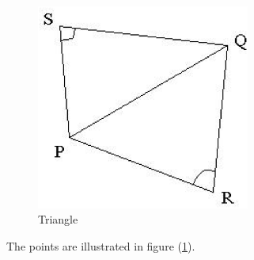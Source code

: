\documentclass{InsightArticle}
\begin{document}
  \begin{figure}
  \begin{center}
    \includegraphics[width=7cm]{PntPQRS.eps} \caption{Triangle} \label{PntPQRS}
    \end{center}
  \end{figure}  
  The points are illustrated in figure (\ref{PntPQRS}).  
  
\end{document}

